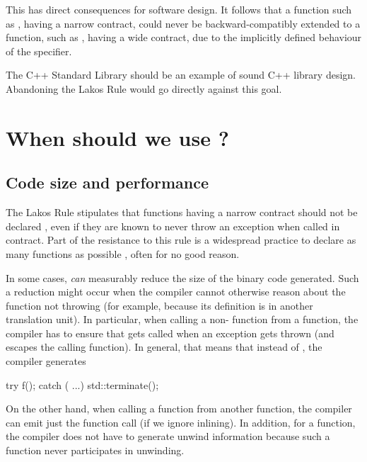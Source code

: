 This has direct consequences for software design. It follows that a function such as , having a narrow contract, could never be backward-compatibly extended to a function, such as , having a wide contract, due to the implicitly defined behaviour of the  specifier. 

The C++ Standard Library should be an example of sound C++ library design. Abandoning the Lakos Rule would go directly against this goal.

\section{When should we use ?}
\label{sec:noexcept}

\subsection{Code size and performance}

The Lakos Rule stipulates that functions having a narrow contract should not be declared , even if they are known to never throw an exception when called in contract. Part of the resistance to this rule is a widespread practice to declare as many functions as possible , often for no good reason.

In some cases,  \emph{can} measurably reduce the size of the binary code generated. Such a reduction might occur when the compiler cannot otherwise reason about the function not throwing (for example, because its definition is in another translation unit). In particular, when calling a non- function  from a  function, the compiler has to ensure that  gets called when an exception gets thrown (and escapes the calling function). In general, that means that instead of , the compiler generates
\begin{codeblock}
try { f(); } catch ( ...) { std::terminate(); }
\end{codeblock}
On the other hand, when calling a  function from another  function, the compiler can emit just the function call (if we ignore inlining). In addition, for a  function, the compiler does not have to generate unwind information because such a function never participates in unwinding.

